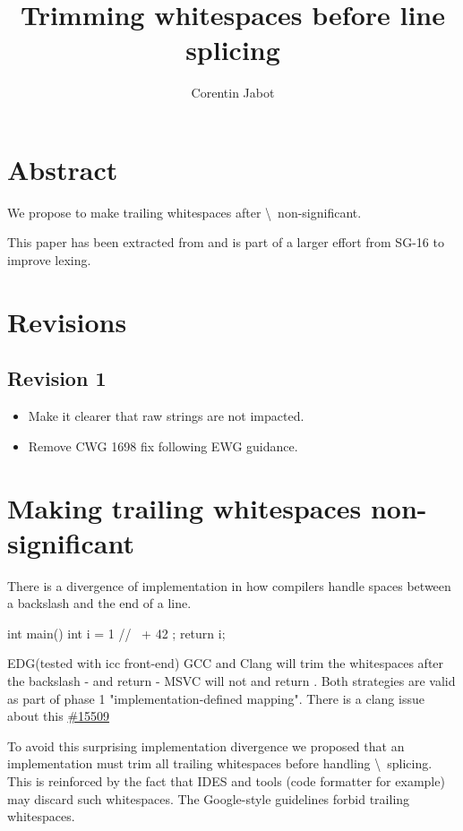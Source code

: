 \documentclass{wg21}
\title{Trimming whitespaces before line splicing}
\author{Corentin Jabot}{corentin.jabot@gmail.com}
\begin{document}
\maketitle

\paperquote{}

\section{Abstract}

We propose to make trailing whitespaces after \textbackslash \ non-significant.

This paper has been extracted from  and is part of a larger effort from SG-16 to improve lexing.

\section{Revisions}

\subsection*{Revision 1}
\begin{itemize}
    \item Make it clearer that raw strings are not impacted. 
    \item Remove CWG 1698 fix following EWG guidance.
\end{itemize}

\section{Making trailing whitespaces non-significant}

There is a divergence of implementation in how compilers handle spaces between a backslash and the end of a line. 

\begin{colorblock}
int main() {
    int i = 1
    //  \
    + 42
    ;
    return i;
}
\end{colorblock}

EDG(tested with icc front-end) GCC and Clang will trim the whitespaces after the backslash - and return  - MSVC will not and return .
Both strategies are valid as part of phase 1 "implementation-defined mapping".
There is a clang issue about this \href{https://bugs.llvm.org/show_bug.cgi?id=15509}{\#15509}

To avoid this surprising implementation divergence we proposed that an implementation must trim all trailing whitespaces before handling \textbackslash \ splicing.
This is reinforced by the fact that IDES and tools (code formatter for example) may discard such whitespaces. The Google-style guidelines forbid trailing whitespaces.
\end{document}
